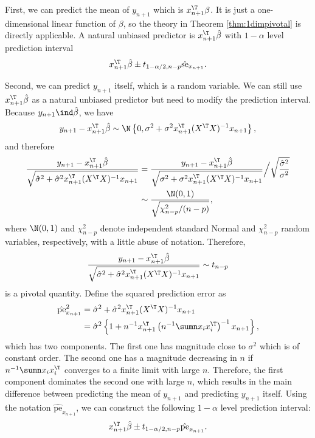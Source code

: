 First, we can predict the mean of $y_{n+1}$ which is $x_{n+1}^{\T}\beta$.
It is just a one-dimensional linear function of $\beta$, so the theory
in Theorem \ref{thm:1dimpivotal} is directly applicable. A natural
unbiased predictor is $x_{n+1}^{\T}\hat{\beta}$ with $1-\alpha$ level
prediction interval
\[
 x_{n+1}^{\T}\hat{\beta} \pm t_{1-\alpha/2,  n-p} \hat{\text{se}}_{x_{n+1}} .
\]

Second, we can predict $y_{n+1}$ itself, which is a random variable.
We can still use $x_{n+1}^{\T}\hat{\beta}$ as a natural unbiased predictor
but need to modify the prediction interval. Because $y_{n+1}\ind\hat{\beta}$,
we have
\[
y_{n+1}-x_{n+1}^{\T}\hat{\beta}\sim\N\left\{ 0,\sigma^{2}+\sigma^{2}x_{n+1}^{\T}(X^{\T}X)^{-1}x_{n+1}\right\} ,
\]
and therefore
\begin{align*}
\frac{y_{n+1}-x_{n+1}^{\T}\hat{\beta}}{\sqrt{\hat{\sigma}^{2}+\hat{\sigma}^{2}x_{n+1}^{\T}(X^{\T}X)^{-1}x_{n+1}}} & =\frac{y_{n+1}-x_{n+1}^{\T}\hat{\beta}}{\sqrt{\sigma^{2}+\sigma^{2}x_{n+1}^{\T}(X^{\T}X)^{-1}x_{n+1}}}\Big/\sqrt{\frac{\hat{\sigma}^{2}}{\sigma^{2}}}\\
 & \sim\frac{\N(0,1)}{\sqrt{\chi_{n-p}^{2}/(n-p)}} , 
\end{align*}
where $\N(0,1)$ and $\chi_{n-p}^{2}$ denote independent standard Normal and $\chi_{n-p}^{2}$ random variables, respectively, with a little abuse of notation. Therefore,  
$$
\frac{y_{n+1}-x_{n+1}^{\T}\hat{\beta}}{\sqrt{\hat{\sigma}^{2}+\hat{\sigma}^{2}x_{n+1}^{\T}(X^{\T}X)^{-1}x_{n+1}}}
  \sim t_{n-p}
$$
is a pivotal quantity. Define  the squared prediction error  as
\begin{align*}
\hat{\text{pe}}_{x_{n+1}}^{2} & =\hat{\sigma}^{2}+\hat{\sigma}^{2}x_{n+1}^{\T}(X^{\T}X)^{-1}x_{n+1}\\
 & =\hat{\sigma}^{2}\left\{ 1+n^{-1}x_{n+1}^{\T}\left(n^{-1}\sumn x_{i}x_{i}^{\T}\right)^{-1}x_{n+1}\right\}  ,
\end{align*}
which has two components. The first one has magnitude close to $\sigma^{2}$
which is of constant order. The second one has a magnitude decreasing
in $n$ if $n^{-1}\sumn x_{i}x_{i}^{\T}$ converges to a finite limit
with large $n$. Therefore, the first component dominates the second
one with large $n$, which results in the main difference between
predicting the mean of $y_{n+1}$ and predicting $y_{n+1}$ itself. Using
the notation $\hat{\text{pe}}_{x_{n+1}}$, we can construct the following
$1-\alpha$ level prediction interval: 
\[
 x_{n+1}^{\T}\hat{\beta} \pm  t_{1-\alpha/2,  n-p} \hat{\text{pe}}_{x_{n+1}} .
\]


